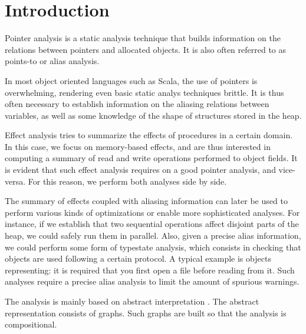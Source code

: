 \chapter{Introduction} \label{chap:intro}
Pointer analysis is a static analysis technique that builds information on the
relations between pointers and allocated objects. It is also often referred to
as points-to or alias analysis.

In most object oriented languages such as Scala, the use of pointers is
overwhelming, rendering even basic static analys techniques brittle. It is thus
often necessary to establish information on the aliasing relations between
variables, as well as some knowledge of the shape of structures stored in the
heap.

Effect analysis tries to summarize the effects of procedures in a certain
domain. In this case, we focus on memory-based effects, and are thus interested
in computing a summary of read and write operations performed to object fields.
It is evident that such effect analysis requires on a good pointer analysis,
and vice-versa. For this reason, we perform both analyses side by side.

The summary of effects coupled with aliasing information can later be used to
perform various kinds of optimizations or enable more sophisticated analyses.
For instance, if we establish that two sequential operations affect disjoint
parts of the heap, we could safely run them in parallel. Also, given a precise
alias information, we could perform some form of typestate analysis, which
consists in checking that objects are used following a certain protocol. A
typical example is objects representing: it is required that you first open a
file before reading from it. Such analyses require a precise alias
analysis to limit the amount of spurious warnings.

The analysis is mainly based on abstract interpretation
\cite{DBLP:conf/popl/CousotC77,DBLP:conf/popl/CousotC02}. The abstract
representation consists of graphs. Such graphs are built so that the analysis
is compositional.

